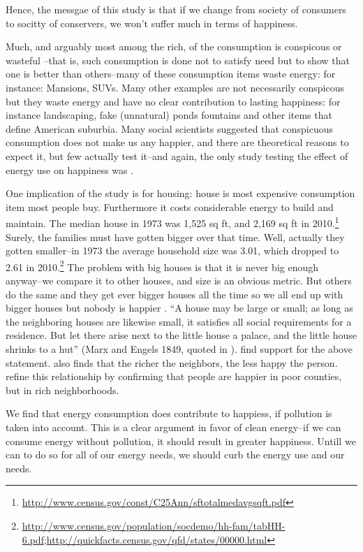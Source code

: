 \documentclass[10pt, letterpaper]{article}
\begin{document}
\begin{spacing}{1.4}
Hence, the messgae of this study is that if we change from society of consumers
to socitty of conservers, we won't suffer much in terms of happiness.

Much, and  arguably most among the rich, of the consumption is conspicous or
wasteful \citep{veblen05a, veblen05b}--that is, such consumption is done not to satisfy need but to show that
one is better than others--many of these consumption items waste energy: for
instance: Mansions, SUVs.  Many other examples are not necessarily conspicous
but they waste energy and have no clear contribution to lasting happiness: for
instance landscaping, fake (unnatural) ponds fountains and other items that
define American suburbia. Many social scientists \citep[e.g.][]{csikszentmihalyi99, frank04, frank05, frank12} suggested that conspicuous consumption
does not make us any happier, and there are theoretical reasons to
expect it, but few actually test it--and again, the only  study testing the
effect of energy use on happiness was \citet{graef81}.

One implication of the study is for housing: house is most expensive consumption
item most people buy. Furthermore it costs considerable energy to build and
maintain. The median house in 1973 was 1,525 sq ft, and 2,169  sq ft in 2010.\footnote{\url{http://www.census.gov/const/C25Ann/sftotalmedavgsqft.pdf}}
Surely, the families must have gotten bigger over that time. Well,
actually they gotten smaller--in 1973 the average household size was
3.01, which dropped to 2.61 in
2010.\footnote{\url{http://www.census.gov/population/socdemo/hh-fam/tabHH-6.pdf};\url{http://quickfacts.census.gov/qfd/states/00000.html}}
The problem with big houses is that it is never big enough anyway--we
compare it to other houses, and size is an obvious metric. But others
do the same and they get ever bigger houses all the time so we all end
up with bigger houses but nobody is happier \citep{frank12}. ``A house may be large or small; as long as the neighboring houses are
likewise small, it satisfies all social requirements for a
residence. But let there arise next to the little house a palace, and
the little house shrinks to a hut'' (Marx and Engels 1849, quoted in
\citet{dittmann10}). \citet{dittmann10} find support for the above
statement. \citet{luttmer05} also finds that the richer the neighbors,
the less happy the person.
\citet{firebaugh09} refine this relationship by confirming that people
are happier in poor counties, but in  rich neighborhoods. 

We find that energy consumption does contribute to happiess, if pollution is
taken into account. This is a clear argument in favor of clean energy--if we can
consume energy without pollution, it should result in greater happiness. Untill
we can to do so for all of our energy needs, we should curb the energy use and
our needs.


\end{spacing}
\end{document}
